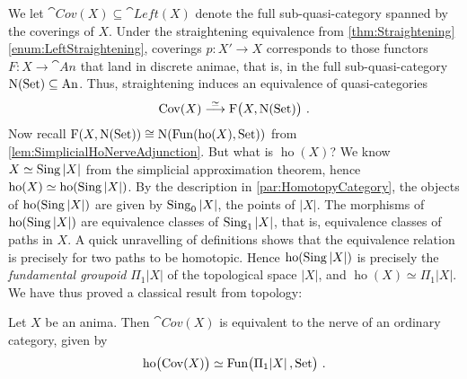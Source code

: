 \begin{numpar}
	We let $\cat{Cov}(X)\subseteq\cat{Left}(X)$ denote the full sub-quasi-category spanned by the coverings of $X$. Under the straightening equivalence from \cref{thm:Straightening}\cref{enum:LeftStraightening}, coverings $p\colon X'\rightarrow X$ corresponds to those functors $F\colon X\rightarrow\cat{An}$ that land in discrete animae, that is, in the full sub-quasi-category $\operatorname{N}(\mathrm{Set})\subseteq \mathrm{An}$. Thus, straightening induces an equivalence of quasi-categories
	\begin{equation*}
		\cat{Cov}(X)\overset{\simeq}{\longrightarrow}\F\lef(X,\N(\cat{Set})\righ)\,.
	\end{equation*}
	Now recall $\operatorname{F}(X,\operatorname{N}(\mathrm{Set}))\cong \operatorname{N}(\operatorname{Fun}(\operatorname{ho}(X),\mathrm{Set}))$ from \cref{lem:SimplicialHoNerveAdjunction}. But what is $\operatorname{ho}(X)$? We know $X\simeq \operatorname{Sing} \left|X\right|$ from the simplicial approximation theorem, hence $\operatorname{ho}(X)\simeq \operatorname{ho}(\operatorname{Sing}\left|X\right|)$. By the description in \cref{par:HomotopyCategory}, the objects of $\operatorname{ho}(\operatorname{Sing}\left|X\right|)$ are given by $\operatorname{Sing}_0\left|X\right|$, the points of $\left|X\right|$. The morphisms of $\operatorname{ho}(\operatorname{Sing}\left|X\right|)$ are equivalence classes of $\operatorname{Sing}_1\left|X\right|$, that is, equivalence classes of paths in $X$. A quick unravelling of definitions shows that the equivalence relation is precisely for two paths to be homotopic. Hence $\operatorname{ho}(\operatorname{Sing}\left|X\right|)$ is precisely the \emph{fundamental groupoid} $\Pi_1\!\left|X\right|$ of the topological space $\left|X\right|$, and $\operatorname{ho}(X)\simeq \Pi_1\!\left|X\right|$. We have thus proved a classical result from topology:
\end{numpar}
\begin{thm}
	Let $X$ be an anima. Then $\cat{Cov}(X)$ is equivalent to the nerve of an ordinary category, given by
	\begin{equation*}
		\operatorname{ho}\lef(\cat{Cov}(X)\righ)\simeq \Fun\lef(\Pi_1\!\left|X\right|,\cat{Set}\righ)\,.
	\end{equation*}
\end{thm}

